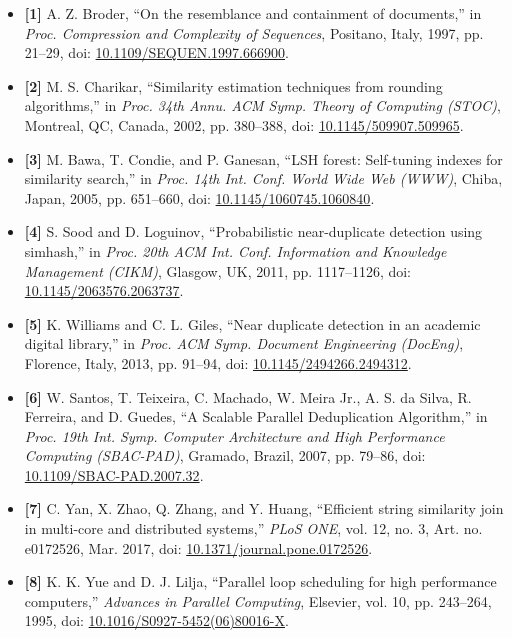 \documentclass[11pt,a4paper]{article}
\renewcommand{\_}{\textunderscore\allowbreak}
\begin{document}
\begin{itemize}[label={}, leftmargin=0pt, itemsep=0.45em]
    \item \textbf{[1]} A. Z. Broder, ``On the resemblance and containment of documents,'' in \textit{Proc. Compression and Complexity of Sequences}, Positano, Italy, 1997, pp. 21--29, doi: \href{https://doi.org/10.1109/SEQUEN.1997.666900}{10.1109/SEQUEN.1997.666900}.
    \item \textbf{[2]} M. S. Charikar, ``Similarity estimation techniques from rounding algorithms,'' in \textit{Proc. 34th Annu. ACM Symp. Theory of Computing (STOC)}, Montreal, QC, Canada, 2002, pp. 380--388, doi: \href{https://doi.org/10.1145/509907.509965}{10.1145/509907.509965}.
    \item \textbf{[3]} M. Bawa, T. Condie, and P. Ganesan, ``LSH forest: Self-tuning indexes for similarity search,'' in \textit{Proc. 14th Int. Conf. World Wide Web (WWW)}, Chiba, Japan, 2005, pp. 651--660, doi: \href{https://doi.org/10.1145/1060745.1060840}{10.1145/1060745.1060840}.
    \item \textbf{[4]} S. Sood and D. Loguinov, ``Probabilistic near-duplicate detection using simhash,'' in \textit{Proc. 20th ACM Int. Conf. Information and Knowledge Management (CIKM)}, Glasgow, UK, 2011, pp. 1117--1126, doi: \href{https://doi.org/10.1145/2063576.2063737}{10.1145/2063576.2063737}.
    \item \textbf{[5]} K. Williams and C. L. Giles, ``Near duplicate detection in an academic digital library,'' in \textit{Proc. ACM Symp. Document Engineering (DocEng)}, Florence, Italy, 2013, pp. 91--94, doi: \href{https://doi.org/10.1145/2494266.2494312}{10.1145/2494266.2494312}.
    \item \textbf{[6]} W. Santos, T. Teixeira, C. Machado, W. Meira Jr., A. S. da Silva, R. Ferreira, and D. Guedes, ``A Scalable Parallel Deduplication Algorithm,'' in \textit{Proc. 19th Int. Symp. Computer Architecture and High Performance Computing (SBAC-PAD)}, Gramado, Brazil, 2007, pp. 79--86, doi: \href{https://doi.org/10.1109/SBAC-PAD.2007.32}{10.1109/SBAC-PAD.2007.32}.
    \item \textbf{[7]} C. Yan, X. Zhao, Q. Zhang, and Y. Huang, ``Efficient string similarity join in multi-core and distributed systems,'' \textit{PLoS ONE}, vol. 12, no. 3, Art. no. e0172526, Mar. 2017, doi: \href{https://doi.org/10.1371/journal.pone.0172526}{10.1371/journal.pone.0172526}.
    \item \textbf{[8]} K. K. Yue and D. J. Lilja, ``Parallel loop scheduling for high performance computers,'' \textit{Advances in Parallel Computing}, Elsevier, vol. 10, pp. 243--264, 1995, doi: \href{https://doi.org/10.1016/S0927-5452(06)80016-X}{10.1016/S0927-5452(06)80016-X}.

\end{itemize}
\end{document}

